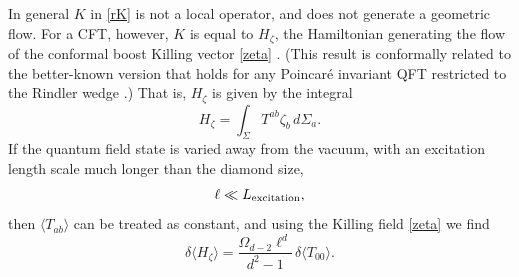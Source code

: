 \documentclass[aps,prd,twocolumn,showpacs,groupedaddress,nofootinbib,longbibliography]{revtex4-1}
\def\beq{\begin{equation}}
\def\eeq{\end{equation}}
\def\la{\langle}
\def\ra{\rangle}
\def\d{\delta}\def\D{\Delta}
\def\z{\zeta}
\def\O{\Omega}
\def\S{\Sigma }
\begin{document}
In general  $K$ in \eqref{rK} is not a local operator, and does not generate a geometric flow.
For a CFT, however, $K$ is equal to $H_\z$, the Hamiltonian generating the 
flow of the conformal boost Killing vector \eqref{zeta} \cite{Hislop:1981uh}. 
(This result is conformally related to the better-known version that holds for any
Poincar\'e invariant QFT restricted to the Rindler wedge \cite{Bisognano:1976za}.)
That is, $H_\z$ is given by the integral
%
\beq\label{Hz}
H_\z = \int_\Sigma T^{ab} \z_b\, d\Sigma_a.
\eeq
%
%
If the quantum field state is varied away from the vacuum, with an excitation length scale much 
longer than the diamond size, 
%
\beq\label{lexcitation}
\ell \ll L_{\rm excitation},
\eeq
then $\la T_{ab}\ra$ can be treated as constant, and 
using the Killing field \eqref{zeta}
we find
%
\beq\label{dHz}
\d \la H_\z\ra =\frac{\O_{d-2} \ell^d }{d^2-1}\, \d\la T_{00}\ra.
\eeq
%
\end{document}

